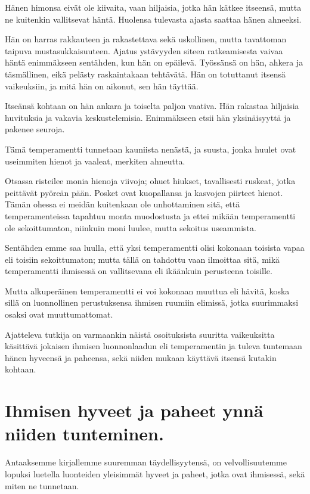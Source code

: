 \documentclass[11pt, twoside, finnish, a5paper]{book}
\begin{document}
Hänen himonsa eivät ole kiivaita, vaan hiljaisia, jotka
hän kätkee itseensä, mutta ne kuitenkin vallitsevat
häntä. Huolensa tulevasta ajasta saattaa hänen ahneeksi.

Hän on harras rakkauteen ja rakastettava sekä uskollinen,
mutta tavattoman taipuva mustasukkaisuuteen.
Ajatus ystävyyden siteen ratkeamisesta vaivaa häntä
enimmäkseen sentähden, kun hän on epäilevä.
Työssänsä on hän, ahkera ja täsmällinen, eikä pelästy
raskaintakaan tehtävätä. Hän on totuttanut itsensä
vaikeuksiin, ja mitä hän on aikonut, sen hän täyttää.

Itseänsä kohtaan on hän ankara ja toiselta paljon
vaativa. Hän rakastaa hiljaisia huvituksia ja vakavia
keskustelemisia. Enimmäkseen etsii hän yksinäisyyttä
ja pakenee seuroja.

Tämä temperamentti tunnetaan kauniista nenästä, ja
suusta, jonka huulet ovat useimmiten hienot ja vaaleat,
merkiten ahneutta.

Otsassa risteilee monia hienoja viivoja; ohuet hiukset,
tavallisesti ruskeat, jotka peittävät pyöreän pään. Posket
ovat kuopallansa ja kasvojen piirteet hienot.
Tämän ohessa ei meidän kuitenkaan ole unhottaminen
sitä, että temperamenteissa tapahtuu monta muodostusta
ja ettei mikään temperamentti ole sekoittumaton,
niinkuin moni luulee, mutta sekoitus useammista.

Sentähden emme saa luulla, että yksi temperamentti
olisi kokonaan toisista vapaa eli toisiin sekoittumaton;
mutta tällä on tahdottu vaan ilmoittaa sitä, mikä
temperamentti ihmisessä on vallitsevana eli ikäänkuin
perusteena toisille.

Mutta  alkuperäinen temperamentti ei voi kokonaan
muuttua  eli hävitä, koska sillä on luonnollinen
perustuksensa ihmisen ruumiin elimissä, jotka suurimmaksi
osaksi ovat muuttumattomat.

Ajatteleva tutkija on varmaankin näistä osoituksista
suuritta vaikeuksitta käsittävä jokaisen ihmisen luonnonlaadun
eli temperamentin ja tuleva tuntemaan hänen hyveensä
ja paheensa,  sekä niiden mukaan käyttävä itsensä kutakin kohtaan.

\chapter*{Ihmisen hyveet ja paheet ynnä niiden tunteminen.}

Antaaksemme kirjallemme suuremman täydellisyytensä,
on velvollisuutemme lopuksi luetella luonteiden
yleisimmät hyveet ja paheet, jotka ovat ihmisessä, sekä
miten ne tunnetaan.
 
\end{document}
